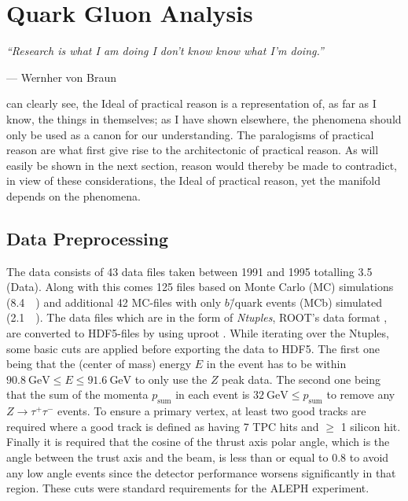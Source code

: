 
\chapter{Quark Gluon Analysis}
\label{ch:quark_gluon_analysis}
\epigraph{\textit{``Research is what I am doing I don't know know what I'm doing.''}}{---  Wernher von Braun}


 can clearly see, the Ideal of practical reason is a representation of, as far as I know, the things in themselves; as I have shown elsewhere, the phenomena should only be used as a canon for our understanding. The paralogisms of practical reason are what first give rise to the architectonic of practical reason. As will easily be shown in the next section, reason would thereby be made to contradict, in view of these considerations, the Ideal of practical reason, yet the manifold depends on the phenomena.


\section{Data Preprocessing}
\label{sec:q:data_preprocessing}

The data consists of \num{43} data files taken between \num{1991} and \num{1995} totalling \SI{3.5}{\giga\byte} (Data). Along with this comes \num{125} files based on Monte Carlo (MC) simulations (\SI{8.4}{\giga\byte}) and additional \num{42} MC-files with only $b$\=/quark events (MCb) simulated (\SI{2.1}{\giga\byte}). The data files which are in the form of \emph{Ntuples}, ROOT's data format \autocite{brunROOTObjectOriented1997}, are converted to HDF5-files by using uproot \autocite{ScikithepUproot2019}. While iterating over the Ntuples, some basic cuts are applied before exporting the data to HDF5. The first one being that the (center of mass) energy $E$ in the event has to be within $\SI{90.8}{\GeV} \leq E \leq \SI{91.6}{\GeV}$ to only use the $Z$ peak data. The second one being that the sum of the momenta $p_\mathrm{sum}$ in each event is $\SI{32}{\GeV} \leq p_\mathrm{sum}$ to remove any $Z \rightarrow \tau^+ \tau^-$ events. To ensure a primary vertex, at least two good tracks are required where a good track is defined as having \num{7} TPC hits and $\geq$ 1 silicon hit. Finally it is required that the cosine of the thrust axis polar angle, which is the angle between the trust axis and the beam, is less than or equal to \num{0.8} to avoid any low angle events since the detector performance worsens significantly in that region. These cuts were standard requirements for the ALEPH experiment.

